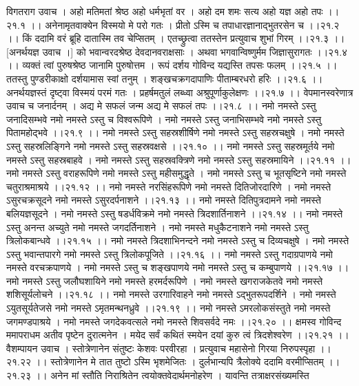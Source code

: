 \documentclass[11pt]{book}
\begin{document}
\begin{landscape}
विगतराग उवाच ।
अहो मतिमतां श्रेष्ठ अहो धर्मभृतां वर ।
अहो दम शमः सत्य अहो यज्ञ अहो तपः ।।२१.१ ।।
अनेनामृतवाक्येन विस्मयो मे परो गतः ।
प्रीतो ऽस्मि च तपाधारज्ञानाद्भुतरसेन च ।।२१.२ ।।
किं ददामि वरं ब्रूहि दातास्मि तव चेप्सितम् ।
एतच्छ्रुत्वा ततस्तेन प्रत्युवाच शुभां गिरम् ।।२१.३ ।।
[अनर्थयज्ञ उवाच ।]
को भवान्वरदश्रेष्ठ देवदानवराक्षसाः ।
अथवा भगवान्विष्णुर्मम जिज्ञासुरागतः ।।२१.४ ।।
व्यक्तं त्वां पुरुषश्रेष्ठ जानामि पुरुषोत्तम ।
रूपं दर्शय गोविन्द यद्यस्ति तपसः फलम् ।।२१.५ ।।
ततस्तु पुण्डरीकाक्षो दर्शयामास स्वां तनुम् ।
शङ्खचक्रगदापाणिः पीताम्बरधरो हरिः ।।२१.६ ।।
अनर्थयज्ञस्तं दृष्ट्वा विस्मयं परमं गतः ।
प्रहर्षमतुलं लब्ध्वा अश्रुपूर्णाकुलेक्षणः ।।२१.७ ।।
वेपमानस्वरेणात्र उवाच च जनार्दनम् ।
अद्य मे सफलं जन्म अद्य मे सफलं तपः ।।२१.८ ।।
नमो नमस्ते ऽस्तु जनादिसम्भवे
नमो नमस्ते ऽस्तु च विश्वरूपिणे ।
नमो नमस्ते ऽस्तु जनाभिसम्भवे
नमो नमस्ते ऽस्तु पितामहोद्भवे ।।२१.९ ।।
नमो नमस्ते ऽस्तु सहस्रशीर्षिणे
नमो नमस्ते ऽस्तु सहस्रचक्षुषे ।
नमो नमस्ते ऽस्तु सहस्रलिङ्गिने
नमो नमस्ते ऽस्तु सहस्रवक्षसे ।।२१.१० ।।
नमो नमस्ते ऽस्तु सहस्रमूर्तये
नमो नमस्ते ऽस्तु सहस्रबाहवे ।
नमो नमस्ते ऽस्तु सहस्रवक्त्रिणे
नमो नमस्ते ऽस्तु सहस्रमायिने ।।२१.११ ।।
नमो नमस्ते ऽस्तु वराहरूपिणे
नमो नमस्ते ऽस्तु महीसमुद्धृते ।
नमो नमस्ते ऽस्तु च भूतसृष्टिने
नमो नमस्ते चतुराश्रमाश्रये ।।२१.१२ ।।
नमो नमस्ते नरसिंहरूपिणे
नमो नमस्ते दितिजोरदारिणे ।
नमो नमस्ते ऽसुरचक्रसूदने
नमो नमस्ते ऽसुरदर्पनाशने ।।२१.१३ ।।
नमो नमस्ते दितिपुत्रदामने
नमो नमस्ते बलियज्ञसूदने ।
नमो नमस्ते ऽस्तु षडर्धविक्रमे
नमो नमस्ते त्रिदशार्तिनाशने ।।२१.१४ ।।
नमो नमस्ते ऽस्तु अनन्त अच्युते
नमो नमस्ते जगदर्तिनाशने ।
नमो नमस्ते मधुकैटनाशने
नमो नमस्ते ऽस्तु त्रिलोकबान्धवे ।।२१.१५ ।।
नमो नमस्ते त्रिदशाभिनन्दने
नमो नमस्ते ऽस्तु च दिव्यचक्षुषे ।
नमो नमस्ते ऽस्तु भवान्तपारगे
नमो नमस्ते ऽस्तु त्रिलोकपूजिते ।।२१.१६ ।।
नमो नमस्ते ऽस्तु गदाग्रपाणये
नमो नमस्ते वरचक्रपाणये ।
नमो नमस्ते ऽस्तु च शङ्खपाणये
नमो नमस्ते ऽस्तु च कम्बुपाणये ।।२१.१७ ।।
नमो नमस्ते ऽस्तु जलौघशायिने
नमो नमस्ते हरमर्दरूपिणे ।
नमो नमस्ते खगराजकेतवे
नमो नमस्ते शशिसूर्यलोचने ।।२१.१८ ।।
नमो नमस्ते उरगारिवाहने
नमो नमस्ते ऽद्भुतरूपदर्शिने ।
नमो नमस्ते ऽयुतसूर्यतेजसे
नमो नमस्ते ऽमृतमन्थनध्रुवे ।।२१.१९ ।।
नमो नमस्ते ऽमरलोकसंस्तुते
नमो नमस्ते जगमण्डपाश्रये ।
नमो नमस्ते जगदेकवत्सले
नमो नमस्ते शिवसर्वदे नमः ।।२१.२० ।।
क्षमस्व गोविन्द ममापराधम
अतीव पृष्टेन दुरात्मनेन ।
मयेद सर्वं कथितं स्मयेन
दयां कुरु त्वं त्रिदशेश्वरेण ।।२१.२१ ।।
वैशम्पायन उवाच ।
स्तोत्रेणानेन संतुष्टः केशवः परवीरहा ।
प्रत्युवाच महासेनो गिरया निरुपस्पृहा ।।२१.२२ ।।
स्तोत्रेणानेन मे तात तुष्टो ऽस्मि भृशमेजितः ।
दुर्लभान्यपि त्रैलोक्ये ददामि वरमीप्सितम् ।।२१.२३ ।।
अनेन मां स्तौति निराश्रितेन
त्वयोक्तवेदार्थमनोहरेण ।
यावन्ति तत्राक्षरसंख्यमस्ति

\end{landscape}
\end{document}
